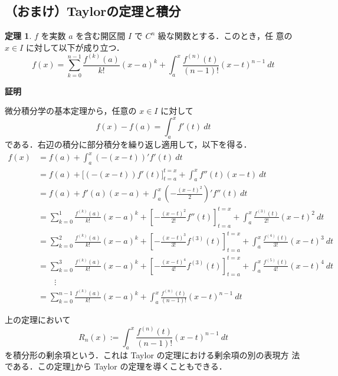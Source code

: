 \documentclass[10pt, uplatex, dvipdfmx]{jsarticle}
\makeatletter
\renewenvironment{proof}[1][\proofname]{\par
  \pushQED{\qed}%
  \normalfont \topsep6\p@\@plus6\p@\relax
  \trivlist
  \item\relax
  {\bfseries
  #1\@addpunct{.}}\hspace\labelsep\ignorespaces
}{%
  \popQED\endtrivlist\@endpefalse
}
\theoremstyle{definition}
\newtheorem{theorem}{定理}[section]
\renewcommand{\proofname}{\textbf{証明}}
\numberwithin{equation}{section}
\makeatother
\begin{document}
\newpage
\subsection{（おまけ）Taylorの定理と積分}

\begin{theorem}\label{thm:taylor-int}
  $f$ を実数 $a$ を含む開区間 $I$ で $C^n$ 級な関数とする．このとき，任
  意の $x \in I$ に対して以下が成り立つ．
  \[
    f(x) = \sum_{k=0}^{n-1} \frac{f^{(k)}(a)}{k!}(x-a)^k +
    \int_{a}^{x}\frac{f^{(n)}(t)}{(n-1)!}(x-t)^{n-1} \ dt
  \]
\end{theorem}

\begin{proof}
  微分積分学の基本定理から，任意の $x \in I$ に対して
  \[
    f(x)-f(a) = \int_{a}^{x} f'(t) \ dt
  \]
  である．右辺の積分に部分積分を繰り返し適用して，以下を得る． 
  \[
    \begin{aligned}
      f(x) &= f(a) + \int_{a}^{x} \left( -(x-t)\right)' f'(t) \ dt\\
      &= f(a) + \Big[\left( -\left(x-t\right)\right)f'(t)\Big]_{t=a}^{t=x} + \int_{a}^{x} f''(t)(x-t)\ dt\\
      &= f(a) + f'(a)(x-a)+ \int_{a}^{x} \left( -\frac{(x-t)^2}{2}\right)' f''(t) \ dt\\
      &= \sum_{k=0}^{1}\frac{f^{(k)}(a)}{k!}(x-a)^k + \left[ -\frac{(x-t)^2}{2!}f''(t)\right]_{t=a}^{t=x}
      + \int_{a}^{x}\frac{f^{(3)}(t)}{2!}(x-t)^2\ dt\\
      &= \sum_{k=0}^{2}\frac{f^{(k)}(a)}{k!}(x-a)^k + \left[-\frac{(x-t)^3}{3!}f^{(3)}(t)\right]_{t=a}^{t=x}
      +\int_{a}^{x} \frac{f^{(4)}(t)}{3!}(x-t)^3 \ dt\\
      &= \sum_{k=0}^{3}\frac{f^{(k)}(a)}{k!}(x-a)^k + \left[-\frac{(x-t)^4}{4!}f^{(3)}(t)\right]_{t=a}^{t=x}
      + \int_{a}^{x} \frac{f^{(5)}(t)}{4!} (x-t)^4 \ dt\\
      &\qquad  \vdots\\
      &= \sum_{k=0}^{n-1}\frac{f^{(k)}(a)}{k!}(x-a)^k
      + \int_{a}^{x} \frac{f^{(n)}(t)}{(n-1)!}(x-t)^{n-1} \ dt
    \end{aligned}
  \]

\end{proof}

上の定理において
\[
  R_{n}(x) := \int_{a}^{x}\frac{f^{(n)}(t)}{(n-1)!}(x-t)^{n-1}\ dt
\]
を積分形の剰余項という．これは Taylor の定理における剰余項の別の表現方
法である．この定理\ref{thm:taylor-int}から Taylor の定理を導くこともできる．
\end{document}
